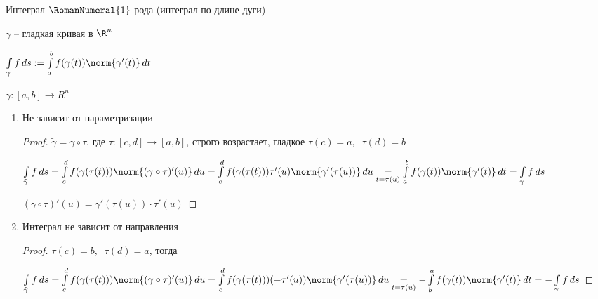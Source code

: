 
\begin{definition}\thmslashn
	
	Интеграл $\RomanNumeral{1}$ рода (интеграл по длине дуги)
	
	$\gamma$ -- гладкая кривая в $\R^n$
	
	$\int\limits_{\gamma} f \,ds := \int\limits_{a}^{b} f(\gamma(t)) \norm{\gamma'(t)} \,dt$
	
	$\gamma: [a, b] \to R^{n}$
	
\end{definition}

\begin{properties}\thmslashn
	
	\begin{enumerate}[1.]
		\item 
		Не зависит от параметризации
		
		\begin{proof}\thmslashn
			
			$\tilde{\gamma} = \gamma \circ \tau$, где $\tau: [c, d] \to [a, b]$, строго возрастает, гладкое $\tau(c) = a, \;\;\tau(d) = b$
			
			$\int\limits_{\tilde{\gamma}} f \,ds = \int\limits_{c}^{d} f(\gamma(\tau(t))) \norm{(\gamma\circ\tau)'(u)} \,du = \int\limits_{c}^{d} f(\gamma(\tau(t))) \tau'(u) \norm{\gamma'(\tau(u))} \,du \underset{t = \tau(u)}= \int\limits_{a}^{b} f(\gamma(t)) \norm{\gamma'(t)} \,dt = \int\limits_{\gamma} f \,ds$
			
			$(\gamma\circ \tau)'(u) = \gamma'(\tau(u))\cdot \tau'(u)$	
			
		\end{proof}
		
		\item
		Интеграл не зависит от направления 
		
		\begin{proof}\thmslashn

			$\tau(c) = b,\;\; \tau(d) = a$, тогда

			
			$\int\limits_{\tilde{\gamma}} f \,ds = \int\limits_{c}^{d} f(\gamma(\tau(t))) \norm{(\gamma\circ\tau)'(u)} \,du = \int\limits_{c}^{d} f(\gamma(\tau(t))) (-\tau'(u)) \norm{\gamma'(\tau(u))} \,du \underset{t = \tau(u)}= -\int\limits_{b}^{a} f(\gamma(t)) \norm{\gamma'(t)} \,dt = -\int\limits_{\gamma} f \,ds$
			

		\end{proof}
	

\end{enumerate}
\end{properties}

